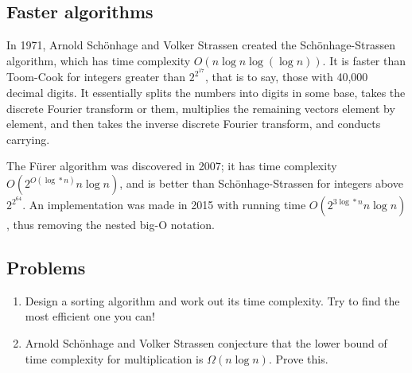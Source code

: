 \documentclass[12pt,a4paper]{report}
\begin{document}
\begin{multicols}{2}
\subsection{Faster algorithms}
In 1971, Arnold Sch\"onhage and Volker Strassen created the Sch\"onhage-Strassen algorithm, which has time complexity \(O(n\log{}n\log(\log{}n))\). It is faster than Toom-Cook for integers greater than \(2^{2^17}\), that is to say, those with 40,000 decimal digits. It essentially splits the numbers into digits in some base, takes the discrete Fourier transform or them, multiplies the remaining vectors element by element, and then takes the inverse discrete Fourier transform, and conducts carrying.

The F\"urer algorithm was discovered in 2007; it has time complexity \(O(2^{O(\log*n)}n\log{}n)\), and is better than Schönhage-Strassen for integers above \(2^{2^{64}}\). An implementation was made in 2015 with running time \(O(2^{3\log*n}n\log{}n)\), thus removing the nested big-O notation.
\subsection{Problems}
\begin{enumerate}
	\item Design a sorting algorithm and work out its time complexity. Try to find the most efficient one you can!
	\item Arnold Sch\"onhage and Volker Strassen conjecture that the lower bound of time complexity for multiplication is \(\Omega(n\log{}n)\). Prove this.
\end{enumerate}

\end{multicols}


\end{document}

